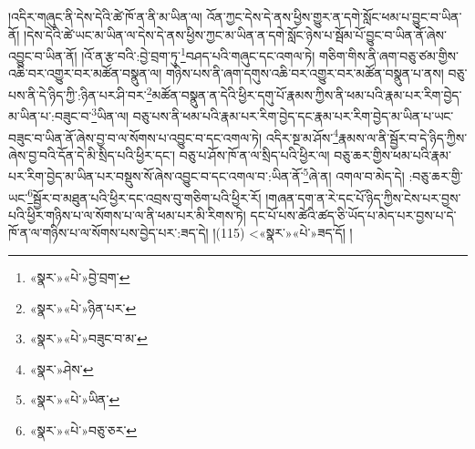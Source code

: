 །འདིར་གཞུང་ནི་དེས་དེའི་ཚེ་ཁོ་ན་ནི་མ་ཡིན་ལ། འོན་ཀྱང་དེས་དེ་ནས་ཕྱིས་གྱུར་ན་དགེ་སློང་ཕམ་པ་བྱུང་བ་ཡིན་ནོ། །དེས་དེའི་ཚེ་ཡང་མ་ཡིན་ལ་དེས་དེ་ནས་ཕྱིས་ཀྱང་མ་ཡིན་ན་དགེ་སློང་ཉེས་པ་སྦོམ་པོ་བྱུང་བ་ཡིན་ནོ་ཞེས་འབྱུང་བ་ཡིན་ནོ། །འོ་ན་རྩ་བའི་:བྱེ་བྲག་ཏུ་\footnote{«སྣར་»«པེ་»བྱེ་བྲག་}བཤད་པའི་གཞུང་དང་འགལ་ཏེ། གཅིག་གིས་ནི་ཞག་བཅུ་ཙམ་གྱིས་འཆི་བར་འགྱུར་བར་མཚོན་བསྣུན་ལ། གཉིས་པས་ནི་ཞག་དགུས་འཆི་བར་འགྱུར་བར་མཚོན་བསྣུན་པ་ནས། བཅུ་པས་ནི་དེ་ཉིད་ཀྱི་:ཉིན་པར་ཤི་བར་\footnote{«སྣར་»«པེ་»ཉིན་པར་}མཚོན་བསྣུན་ན་དེའི་ཕྱིར་དགུ་པོ་རྣམས་ཀྱིས་ནི་ཕམ་པའི་རྣམ་པར་རིག་བྱེད་མ་ཡིན་པ་:བཟུང་བ་\footnote{«སྣར་»«པེ་»བཟུང་བ་མ་}ཡིན་ལ། བཅུ་པས་ནི་ཕམ་པའི་རྣམ་པར་རིག་བྱེད་དང་རྣམ་པར་རིག་བྱེད་མ་ཡིན་པ་ཡང་བཟུང་བ་ཡིན་ནོ་ཞེས་བྱ་བ་ལ་སོགས་པ་འབྱུང་བ་དང་འགལ་ཏེ། འདིར་སྔ་མ་ཤོས་\footnote{«སྣར་»ཤེས་}རྣམས་ལ་ནི་སྦྱོར་བ་དེ་ཉིད་ཀྱིས་ཞེས་བྱ་བའི་དོན་དེ་མི་སྲིད་པའི་ཕྱིར་དང་། བཅུ་པ་ཤོས་ཁོ་ན་ལ་སྲིད་པའི་ཕྱིར་ལ། བཅུ་ཆར་གྱིས་ཕམ་པའི་རྣམ་པར་རིག་བྱེད་མ་ཡིན་པར་བསྡུས་སོ་ཞེས་འབྱུང་བ་དང་འགལ་བ་:ཡིན་ནོ་\footnote{«སྣར་»«པེ་»ཡིན་}ཞེ་ན། འགལ་བ་མེད་དེ། :བཅུ་ཆར་གྱི་ཡང་\footnote{«སྣར་»«པེ་»བཅུ་ཅར་}སྦྱོར་བ་མཐུན་པའི་ཕྱིར་དང་འབྲས་བུ་གཅིག་པའི་ཕྱིར་རོ། །གཞན་དག་ན་རེ་དང་པོ་ཉིད་ཀྱིས་ངེས་པར་བྱས་པའི་ཕྱིར་གཉིས་པ་ལ་སོགས་པ་ལ་ནི་ཕམ་པར་མི་རིགས་ཏེ། དང་པོ་པས་ཚེའི་ཚད་ཅི་ཡོད་པ་མེད་པར་བྱས་པ་དེ་ཁོ་ན་ལ་གཉིས་པ་ལ་སོགས་པས་བྱེད་པར་:ཟད་དེ། །(115) <«སྣར་»«པེ་»ཟད་དོ། །
